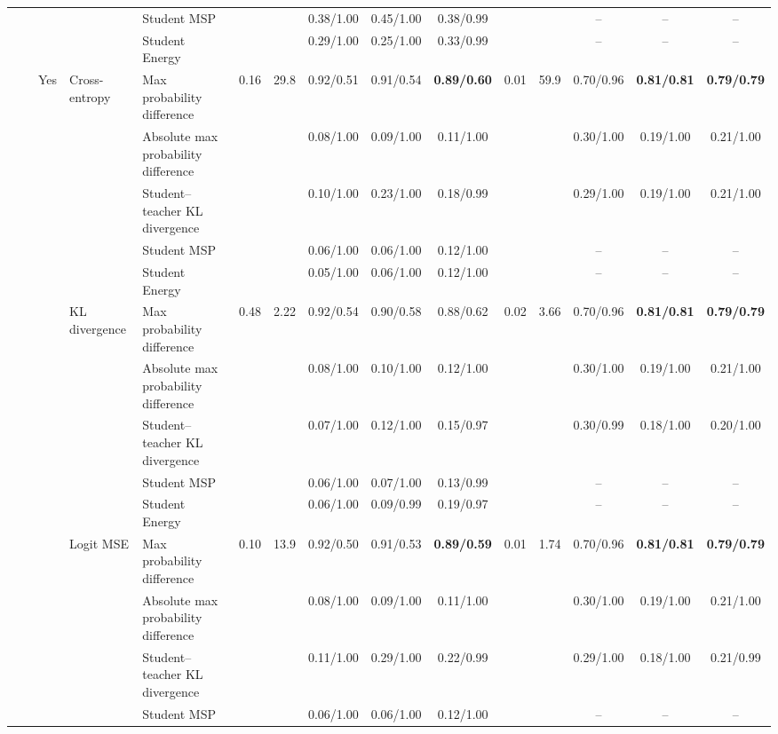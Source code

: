 \documentclass[border=2pt]{standalone}
\begin{document}
\begin{tabular}{lllllcccccccccc}
 &  &  &  & Student MSP &  &  & 0.38/1.00 & 0.45/1.00 & 0.38/0.99 &  &  & -- & -- & -- \\
 &  &  &  & Student Energy &  &  & 0.29/1.00 & 0.25/1.00 & 0.33/0.99 &  &  & -- & -- & -- \\
 &  & Yes & Cross-entropy & Max probability difference & 0.16 & 29.8 & 0.92/0.51 & 0.91/0.54 & \textbf{0.89/0.60} & 0.01 & 59.9 & 0.70/0.96 & \textbf{0.81/0.81} & \textbf{0.79/0.79} \\
 &  &  &  & Absolute max probability difference &  &  & 0.08/1.00 & 0.09/1.00 & 0.11/1.00 &  &  & 0.30/1.00 & 0.19/1.00 & 0.21/1.00 \\
 &  &  &  & Student--teacher KL divergence &  &  & 0.10/1.00 & 0.23/1.00 & 0.18/0.99 &  &  & 0.29/1.00 & 0.19/1.00 & 0.21/1.00 \\
 &  &  &  & Student MSP &  &  & 0.06/1.00 & 0.06/1.00 & 0.12/1.00 &  &  & -- & -- & -- \\
 &  &  &  & Student Energy &  &  & 0.05/1.00 & 0.06/1.00 & 0.12/1.00 &  &  & -- & -- & -- \\
 &  &  & KL divergence & Max probability difference & 0.48 & 2.22 & 0.92/0.54 & 0.90/0.58 & 0.88/0.62 & 0.02 & 3.66 & 0.70/0.96 & \textbf{0.81/0.81} & \textbf{0.79/0.79} \\
 &  &  &  & Absolute max probability difference &  &  & 0.08/1.00 & 0.10/1.00 & 0.12/1.00 &  &  & 0.30/1.00 & 0.19/1.00 & 0.21/1.00 \\
 &  &  &  & Student--teacher KL divergence &  &  & 0.07/1.00 & 0.12/1.00 & 0.15/0.97 &  &  & 0.30/0.99 & 0.18/1.00 & 0.20/1.00 \\
 &  &  &  & Student MSP &  &  & 0.06/1.00 & 0.07/1.00 & 0.13/0.99 &  &  & -- & -- & -- \\
 &  &  &  & Student Energy &  &  & 0.06/1.00 & 0.09/0.99 & 0.19/0.97 &  &  & -- & -- & -- \\
 &  &  & Logit MSE & Max probability difference & 0.10 & 13.9 & 0.92/0.50 & 0.91/0.53 & \textbf{0.89/0.59} & 0.01 & 1.74 & 0.70/0.96 & \textbf{0.81/0.81} & \textbf{0.79/0.79} \\
 &  &  &  & Absolute max probability difference &  &  & 0.08/1.00 & 0.09/1.00 & 0.11/1.00 &  &  & 0.30/1.00 & 0.19/1.00 & 0.21/1.00 \\
 &  &  &  & Student--teacher KL divergence &  &  & 0.11/1.00 & 0.29/1.00 & 0.22/0.99 &  &  & 0.29/1.00 & 0.18/1.00 & 0.21/0.99 \\
 &  &  &  & Student MSP &  &  & 0.06/1.00 & 0.06/1.00 & 0.12/1.00 &  &  & -- & -- & -- \\

\end{tabular}
\end{document}
